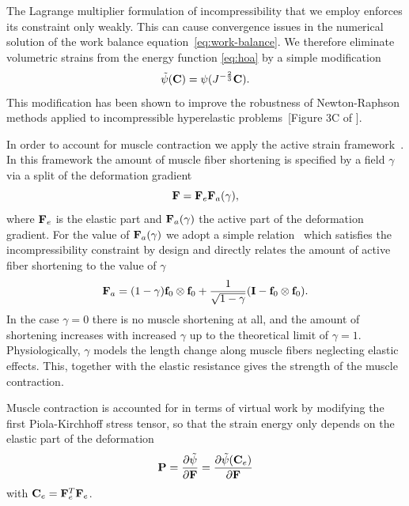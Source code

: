 The Lagrange multiplier formulation of incompressibility that we 
 employ enforces its constraint only weakly. This can cause
 convergence issues in the numerical solution of the work balance equation~\eqref{eq:work-balance}. We therefore
 eliminate volumetric strains from the energy function \eqref{eq:hoa}
 by a simple modification
 \begin{equation}
  \tilde{\psi}(\mathbf{C}) = \psi(J^{-\frac{2}{3}}\mathbf{C}).
 \label{eq:strain_energy}
 \end{equation}
 This modification has been shown to improve the robustness of
 Newton-Raphson methods applied to incompressible hyperelastic
 problems~[Figure 3C of \cite{land2015improving}].

In order to account for muscle contraction we apply the 
active strain framework~\cite{nardinocchi2007active}.  In this framework the amount
of muscle fiber shortening is specified by a field $\gamma$ via
a split of the deformation gradient
\begin{equation}
  \label{eq:fsplit}
  \mathbf{F} = \mathbf{F}_e \mathbf{F}_a(\gamma),
\end{equation}
where $\mathbf{F}_e$ is the elastic part and $\mathbf{F}_a(\gamma)$ the active
part of the deformation gradient. For the value of $\mathbf{F}_a(\gamma)$
we adopt a simple relation~\cite{gjerald2015patient, evangelista2011torsion} which satisfies
the incompressibility constraint by design and directly relates the
amount of active fiber shortening to the value of $\gamma$
\begin{equation}
  \mathbf{F}_a = (1 - \gamma) \mathbf{f}_0 \otimes \mathbf{f}_0  + \frac{1}{\sqrt{1 - \gamma}} (\mathbf{I}- \mathbf{f}_0 \otimes \mathbf{f}_0).
 \label{eq:active_strain}
\end{equation}
In the case $\gamma = 0$ there is no muscle shortening at all, and the
amount of shortening increases with increased $\gamma$ up to the
theoretical limit of $\gamma = 1$. Physiologically, $\gamma$ models the 
length change along muscle fibers neglecting elastic effects. This, together with the elastic
resistance gives the strength of the muscle contraction.

Muscle contraction is accounted for in terms of virtual work by
modifying the first Piola-Kirchhoff stress tensor, so
that the strain energy only depends on the elastic part of the
deformation
\begin{equation}
 \mathbf{P} = \frac{\partial \tilde{\psi}}{\partial \mathbf{F}} = \frac{\partial \tilde{\psi} (\mathbf{C}_e)}{\partial \mathbf{F}}
\label{eq:active_strain_energy}
\end{equation}
with $\mathbf{C}_e = \mathbf{F}_e^T\mathbf{F}_e$.

